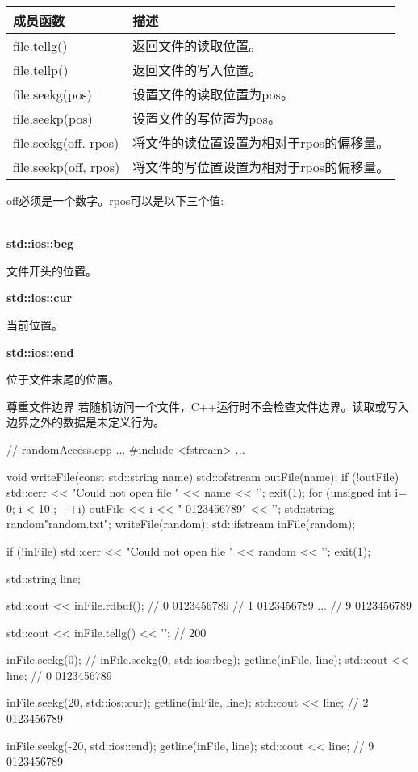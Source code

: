 \begin{longtable}[c]{|l|l|}
\hline
\textbf{成员函数} & \textbf{描述}                    \\ \hline
\endfirsthead
%
\endhead
%
file.tellg()             & 返回文件的读取位置。      \\ \hline
file.tellp()             & 返回文件的写入位置。     \\ \hline
file.seekg(pos)          & 设置文件的读取位置为pos。  \\ \hline
file.seekp(pos)          & 设置文件的写位置为pos。 \\ \hline
file.seekg(off. rpos) & 将文件的读位置设置为相对于rpos的偏移量。  \\ \hline
file.seekp(off, rpos) & 将文件的写位置设置为相对于rpos的偏移量。 \\ \hline
\end{longtable}

off必须是一个数字。rpos可以是以下三个值:

\noindent
\\\textbf{std::ios::beg}

文件开头的位置。

\noindent
\textbf{std::ios::cur}

当前位置。

\noindent
\textbf{std::ios::end}

位于文件末尾的位置。

\begin{myWarning}{尊重文件边界}
若随机访问一个文件，C++运行时不会检查文件边界。读取或写入边界之外的数据是未定义行为。
\end{myWarning}


\begin{cpp}
// randomAccess.cpp
...
#include <fstream>
...

void writeFile(const std::string name){
	std::ofstream outFile(name);
	if (!outFile){
		std::cerr << "Could not open file " << name << '\n';
		exit(1);
	}
	for (unsigned int i= 0; i < 10 ; ++i){
		outFile << i << " 0123456789" << '\n';
	}
}
std::string random{"random.txt"};
writeFile(random);
std::ifstream inFile(random);

if (!inFile){
	std::cerr << "Could not open file " << random << '\n';
	exit(1);
}

std::string line;

std::cout << inFile.rdbuf();
// 0 0123456789
// 1 0123456789
...
// 9 0123456789

std::cout << inFile.tellg() << '\n'; // 200

inFile.seekg(0); // inFile.seekg(0, std::ios::beg);
getline(inFile, line);
std::cout << line; // 0 0123456789

inFile.seekg(20, std::ios::cur);
getline(inFile, line);
std::cout << line; // 2 0123456789

inFile.seekg(-20, std::ios::end);
getline(inFile, line);
std::cout << line; // 9 0123456789
\end{cpp}

